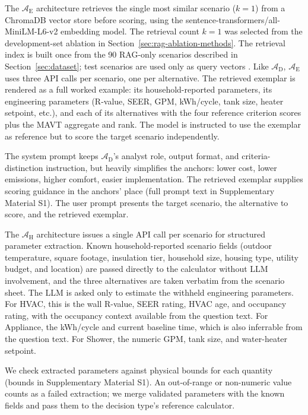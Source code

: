\documentclass[final,3p,times]{elsarticle}
\begin{document}
The $\mathcal{A}_{\text{E}}$ architecture retrieves the single most similar scenario ($k=1$) from a ChromaDB vector store before scoring, using the sentence-transformers/all-MiniLM-L6-v2 embedding model. The retrieval count $k=1$ was selected from the development-set ablation in Section~\ref{sec:rag-ablation-methods}. The retrieval index is built once from the 90 RAG-only scenarios described in Section~\ref{sec:dataset}; test scenarios are used only as query vectors \cite{lewis2020}. Like $\mathcal{A}_{\text{D}}$, $\mathcal{A}_{\text{E}}$ uses three API calls per scenario, one per alternative. The retrieved exemplar is rendered as a full worked example: its household-reported parameters, its engineering parameters (R-value, SEER, GPM, kWh/cycle, tank size, heater setpoint, etc.), and each of its alternatives with the four reference criterion scores plus the MAVT aggregate and rank. The model is instructed to use the exemplar as reference but to score the target scenario independently.

The system prompt keeps $\mathcal{A}_{\text{D}}$'s analyst role, output format, and criteria-distinction instruction, but heavily simplifies the anchors: lower cost, lower emissions, higher comfort, easier implementation. The retrieved exemplar supplies scoring guidance in the anchors' place (full prompt text in Supplementary Material S1). The user prompt presents the target scenario, the alternative to score, and the retrieved exemplar.


The $\mathcal{A}_{\text{H}}$ architecture issues a single API call per scenario for structured parameter extraction. Known household-reported scenario fields (outdoor temperature, square footage, insulation tier, household size, housing type, utility budget, and location) are passed directly to the calculator without LLM involvement, and the three alternatives are taken verbatim from the scenario sheet. The LLM is asked only to estimate the withheld engineering parameters. For HVAC, this is the wall R-value, SEER rating, HVAC age, and occupancy rating, with the occupancy context available from the question text. For Appliance, the kWh/cycle and current baseline time, which is also inferrable from the question text. For Shower, the numeric GPM, tank size, and water-heater setpoint.

We check extracted parameters against physical bounds for each quantity (bounds in Supplementary Material S1). An out-of-range or non-numeric value counts as a failed extraction; we merge validated parameters with the known fields and pass them to the decision type's reference calculator.
\end{document}
